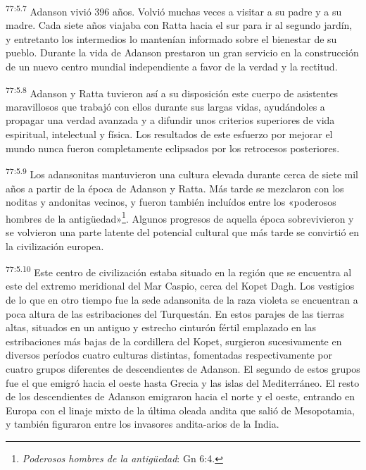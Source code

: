 \par
\textsuperscript{77:5.7} Adanson vivió 396 años. Volvió muchas veces a visitar a su padre y a su madre. Cada siete años viajaba con Ratta hacia el sur para ir al segundo jardín, y entretanto los intermedios lo mantenían informado sobre el bienestar de su pueblo. Durante la vida de Adanson prestaron un gran servicio en la construcción de un nuevo centro mundial independiente a favor de la verdad y la rectitud.

\par
\textsuperscript{77:5.8} Adanson y Ratta tuvieron así a su disposición este cuerpo de asistentes maravillosos que trabajó con ellos durante sus largas vidas, ayudándoles a propagar una verdad avanzada y a difundir unos criterios superiores de vida espiritual, intelectual y física. Los resultados de este esfuerzo por mejorar el mundo nunca fueron completamente eclipsados por los retrocesos posteriores.

\par
\textsuperscript{77:5.9} Los adansonitas mantuvieron una cultura elevada durante cerca de siete mil años a partir de la época de Adanson y Ratta. Más tarde se mezclaron con los noditas y andonitas vecinos, y fueron también incluídos entre los «poderosos hombres de la antig\"uedad»\footnote{\textit{Poderosos hombres de la antig\"uedad}: Gn 6:4.}. Algunos progresos de aquella época sobrevivieron y se volvieron una parte latente del potencial cultural que más tarde se convirtió en la civilización europea.

\par
\textsuperscript{77:5.10} Este centro de civilización estaba situado en la región que se encuentra al este del extremo meridional del Mar Caspio, cerca del Kopet Dagh. Los vestigios de lo que en otro tiempo fue la sede adansonita de la raza violeta se encuentran a poca altura de las estribaciones del Turquestán. En estos parajes de las tierras altas, situados en un antiguo y estrecho cinturón fértil emplazado en las estribaciones más bajas de la cordillera del Kopet, surgieron sucesivamente en diversos períodos cuatro culturas distintas, fomentadas respectivamente por cuatro grupos diferentes de descendientes de Adanson. El segundo de estos grupos fue el que emigró hacia el oeste hasta Grecia y las islas del Mediterráneo. El resto de los descendientes de Adanson emigraron hacia el norte y el oeste, entrando en Europa con el linaje mixto de la última oleada andita que salió de Mesopotamia, y también figuraron entre los invasores andita-arios de la India.


